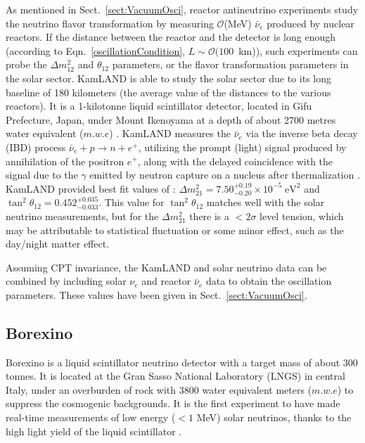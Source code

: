 As mentioned in Sect.~\ref{sect:VacuumOsci}, reactor antineutrino experiments study the neutrino flavor transformation by measuring $\mathcal{O}$(MeV) $\bar{\nu}_e$ produced by nuclear reactors. If the distance between the reactor and the detector is long enough (according to Eqn.~\ref{oscillationCondition}, $L\sim\mathcal{O}(100$~km)), such experiments can probe the $\Delta m^2_{12}$ and $\theta_{12}$ parameters, or the flavor transformation parameters in the solar sector. KamLAND is able to study the solar sector due to its long baseline of 180 kilometers (the average value of the distances to the various reactors). It is a 1-kilotonne liquid scintillator detector, located in Gifu Prefecture, Japan, under Mount Ikenoyama at a depth of about 2700 metres water equivalent ($m.w.e$) \cite{abe2008precision}. KamLAND measures the $\bar{\nu}_e$ via the inverse beta decay (IBD) process $\bar{\nu}_e + p \rightarrow n + e^+$, utilizing the prompt (light) signal produced by annihilation of the positron $e^+$, along with the delayed
coincidence with the signal due to the $\gamma$ emitted by neutron capture on a nucleus after thermalization \cite{pdg2020}. KamLAND provided best fit values of \cite{gando2011constraints}: $\Delta m_{21}^2=7.50^{+0.19}_{-0.20}\times10^{-5} \; \mathrm{eV^2}$ and $\tan^2\theta_{12}=0.452^{+0.035}_{-0.033}$. This value for $\tan^2\theta_{12}$ matches well with the solar neutrino measurements, but for the $\Delta m^2_{21}$ there is a $<2\sigma$ level tension, which may be attributable to statistical fluctuation or some minor effect, such as the day/night matter effect.

Assuming CPT invariance, the KamLAND and solar neutrino data can be combined by including solar $\nu_e$ and reactor $\bar{\nu}_e$ data to obtain the oscillation parameters. These values have been given in Sect.~\ref{sect:VacuumOsci}.

\subsection{Borexino}

Borexino is a liquid scintillator neutrino detector with a target mass of about 300 tonnes. It is located at the Gran Sasso National Laboratory (LNGS) in central Italy, under an overburden of rock with 3800 water equivalent meters ($m.w.e$) to suppress the cosmogenic backgrounds. It is the first experiment to have made real-time measurements of low energy ($<1$ MeV) solar neutrinos, thanks to the high light yield of the liquid scintillator \cite{agostini2020improved}.

